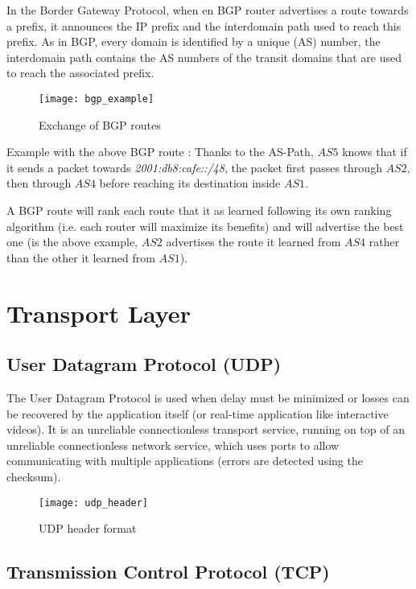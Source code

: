 In the Border Gateway Protocol, when en BGP router advertises a route towards a prefix, it announces the IP prefix and the interdomain path used to reach this prefix. As in BGP, every domain is identified by a unique  (AS) number, the interdomain path contains the AS numbers of the transit domains that are used to reach the associated prefix.

\begin{figure}[H]
	\centering
	\texttt{[image: bgp\_example]}
	\caption{Exchange of BGP routes}
\end{figure}

Example with the above BGP route : Thanks to the AS-Path, $AS5$ knows that if it sends a packet towards \textit{2001:db8:cafe::/48}, the packet first passes through $AS2$, then through $AS4$ before reaching its destination inside $AS1$.

A BGP route will rank each route that it as learned following its own ranking algorithm (i.e. each router will maximize its benefits) and will advertise the best one (is the above example, $AS2$ advertises the route it learned from $AS4$ rather than the other it learned from $AS1$).

\section{Transport Layer}

\subsection[UDP]{User Datagram Protocol (UDP)}

The User Datagram Protocol is used when delay must be minimized or losses can be recovered by the application itself (or real-time application like interactive videos). It is an unreliable connectionless transport service, running on top of an unreliable connectionless network service, which uses ports to allow communicating with multiple applications (errors are detected using the checksum).
\begin{figure}[H]
    \centering
    \texttt{[image: udp\_header]}
    \caption{UDP header format}
\end{figure}

\subsection[TCP]{Transmission Control Protocol (TCP)}

